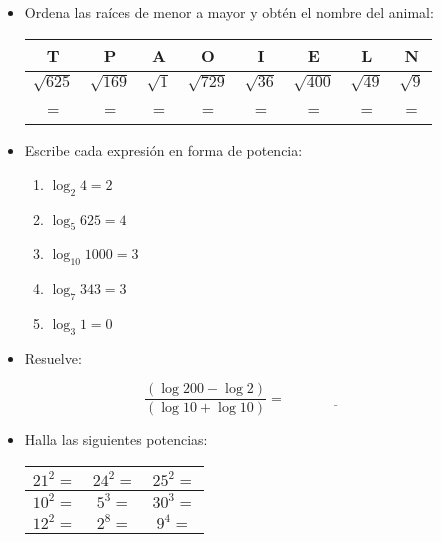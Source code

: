 \documentclass[12pt,a4paper]{article}
\begin{document}
\vspace{1cm}

\begin{itemize}
\item Ordena las raíces de menor a mayor y obtén el nombre del animal:

\vspace{0.5cm}

\begin{center}
\begin{tabular}{|c|c|c|c|c|c|c|c|}
\hline
T & P & A & O & I & E & L & N \\
\hline
$\sqrt{625}$ & $\sqrt{169}$ & $\sqrt{1}$ & $\sqrt{729}$ & $\sqrt{36}$ & $\sqrt{400}$ & $\sqrt{49}$ & $\sqrt{9}$ \\
\hline
= & = & = & = & = & = & = & = \\
\hline
\end{tabular}
\end{center}

\item Escribe cada expresión en forma de potencia:

\begin{enumerate}[label=\alph*.]
\item $\log_2 4 = 2$ \underline{\hspace{3cm}}
\item $\log_5 625 = 4$ \underline{\hspace{3cm}}
\item $\log_{10} 1000 = 3$ \underline{\hspace{3cm}}
\item $\log_7 343 = 3$ \underline{\hspace{3cm}}
\item $\log_3 1 = 0$ \underline{\hspace{3cm}}
\end{enumerate}

\item Resuelve:

$$\frac{(\log 200 - \log 2)}{(\log 10 + \log 10)} = \underline{\hspace{3cm}}$$

\item Halla las siguientes potencias:

\begin{center}
\begin{tabular}{|c|c|c|}
\hline
$21^2=$ & $24^2=$ & $25^2=$ \\
\hline
$10^2=$ & $5^3=$ & $30^3=$ \\
\hline
$12^2=$ & $2^8=$ & $9^4=$ \\
\hline
\end{tabular}
\end{center}


\end{itemize}
\end{document}
